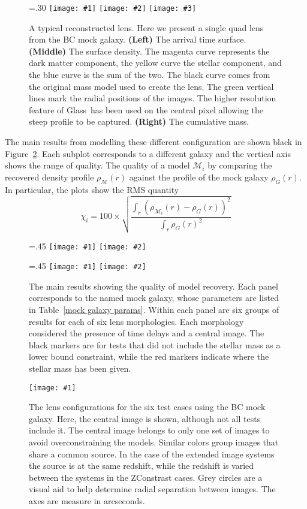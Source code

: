 \documentclass[galley]{mn2e}
\newcommand{\Glass}{{\sc Glass}}
\newcommand{\M}{\ensuremath{\mathscr{M}}}
\newcommand{\tabref}[1] {Table~\ref{#1}}
\newcommand{\figref}[1] {Figure~\ref{#1}}
\newcommand\plotone[1]{%
 \centering
 \leavevmode
 \texttt{[image: \#1]}%
}%
\newcommand\plottwo[2]{{%
 \centering
 \leavevmode
 \columnwidth=.45\columnwidth
 \texttt{[image: \#1]}%
 \hfil
 \texttt{[image: \#2]}%
}}%
\newcommand\plotthree[3]{{%
 \centering
 \leavevmode
 \columnwidth=.30\columnwidth
 \texttt{[image: \#1]}%
 \hfil
 \texttt{[image: \#2]}%
 \hfil
 \texttt{[image: \#3]}%
}}%
\begin{document}
\begin{figure}
\plotthree{BCQuadR1a_TmS-a.pdf}{BCQuadR1a_TmS-b.pdf}{BCQuadR1a_TmS-c.pdf}
\caption{A typical reconstructed lens. Here we present a single quad lens from 
the BC mock galaxy.
\textbf{(Left)}
The arrival time surface. 
\textbf{(Middle)}
The surface density. The magenta curve represents the dark matter component,
the yellow curve the stellar component, and the blue curve is the sum of the two.
The black curve comes from the original mass model used to create the lens.
The green vertical lines mark the radial positions of the images. The higher
resolution feature of \Glass\ has been used on the central pixel allowing the
steep profile to be captured.
\textbf{(Right)}
The cumulative mass.}
\label{reconstruction}
\end{figure}

The main results from modelling these different configuration are shown black in
\figref{main results}. Each subplot corresponds to a different galaxy and
the vertical axis shows the range of quality.  The quality of a
model $\M_i$ by comparing the recovered density profile $\rho_\M(r)$ against
the profile of the mock galaxy $\rho_G(r)$.  In particular, the plots show the
RMS quantity
%
\begin{equation}
  \chi_i = 100 \times \sqrt{\frac{\int_r (\rho_{\M_i}(r) - \rho_G(r))^2}{\int_r \rho_G(r)^2}}
\end{equation}
%

\begin{figure}
\plottwo{AAchi2_profile.pdf}{BBchi2_profile.pdf}

\plottwo{ACchi2_profile.pdf}{BCchi2_profile.pdf}
\caption{The main results showing the quality of model recovery. Each panel corresponds to 
the named mock galaxy, whose parameters are listed in \tabref{mock galaxy params}. Within
each panel are six groups of results for each of six lens morphologies. Each morphology
considered the presence of time delays and a central image. The black markers are for tests
that did not include the stellar mass as a lower bound constraint, while the red markers
indicate where the stellar mass has been given.}
\label{main results}
\end{figure}

\begin{figure}
\plotone{BCarrival_surfaces}
\caption{The lens configurations for the six test cases using the BC mock galaxy. Here,
the central image is shown, although not all tests include it. The central image belongs
to only one set of images to avoid overconstraining the models. Similar colors group
images that share a common source. In the case of the extended image systems the source
is at the same redshift, while the redshift is varied between the systems in the 
ZConstrast cases. Grey circles are a visual aid to help determine radial separation
between images. The axes are measure in arcseconds.}
\label{reconstruction}
\end{figure}
\end{document}
